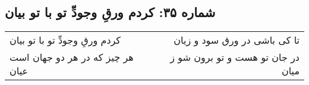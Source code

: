 \begin{center}
\section*{شماره ۳۵: کردم ورقِ وجودِّ تو با تو بیان}
\label{sec:035}
\begin{longtable}{l p{0.5cm} r}
کردم ورقِ وجودِّ تو با تو بیان
&&
تا کی باشی در ورق سود و زیان
\\
هر چیز که در هر دو جهان است عیان
&&
در جان تو هست و تو برون شو ز میان
\\
\end{longtable}
\end{center}
